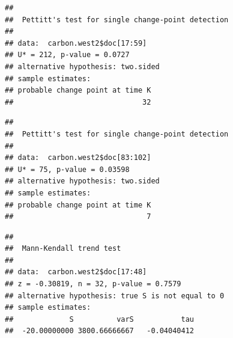 \documentclass[12pt,]{article}
\newenvironment{Shaded}{\begin{snugshade}}{\end{snugshade}}
\newcommand{\KeywordTok}[1]{\textcolor[rgb]{0.13,0.29,0.53}{\textbf{#1}}}
\newcommand{\DecValTok}[1]{\textcolor[rgb]{0.00,0.00,0.81}{#1}}
\newcommand{\CommentTok}[1]{\textcolor[rgb]{0.56,0.35,0.01}{\textit{#1}}}
\newcommand{\OperatorTok}[1]{\textcolor[rgb]{0.81,0.36,0.00}{\textbf{#1}}}
\newcommand{\NormalTok}[1]{#1}
\begin{document}
\begin{Shaded}
\end{Shaded}

\begin{verbatim}
## 
##  Pettitt's test for single change-point detection
## 
## data:  carbon.west2$doc[17:59]
## U* = 212, p-value = 0.0727
## alternative hypothesis: two.sided
## sample estimates:
## probable change point at time K 
##                              32
\end{verbatim}

\begin{Shaded}
\end{Shaded}

\begin{verbatim}
## 
##  Pettitt's test for single change-point detection
## 
## data:  carbon.west2$doc[83:102]
## U* = 75, p-value = 0.03598
## alternative hypothesis: two.sided
## sample estimates:
## probable change point at time K 
##                               7
\end{verbatim}

\begin{Shaded}
\end{Shaded}

\begin{verbatim}
## 
##  Mann-Kendall trend test
## 
## data:  carbon.west2$doc[17:48]
## z = -0.30819, n = 32, p-value = 0.7579
## alternative hypothesis: true S is not equal to 0
## sample estimates:
##             S          varS           tau 
##  -20.00000000 3800.66666667   -0.04040412
\end{verbatim}
\end{document}
